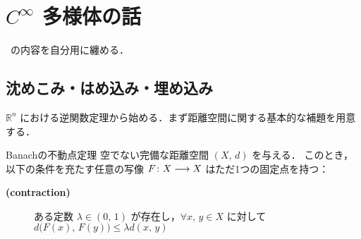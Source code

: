 \documentclass[TQFT_main]{subfiles}
\begin{document}
\chapter{$C^\infty$ 多様体の話}

~\cite[Chapter4, 5, 6]{Lee2012smooth}の内容を自分用に纏める．

\section{沈めこみ・はめ込み・埋め込み}

$\mathbb{R}^n$ における逆関数定理から始める．まず距離空間に関する基本的な補題を用意する．

\begin{mylem}[label=lem:contraction]{Banachの不動点定理}
    空でない完備な距離空間 $(X,\, d)$ を与える．
    このとき，以下の条件を充たす任意の写像 $F \colon X \longrightarrow X$ はただ1つの固定点を持つ：
    \begin{description}
        \item[\textbf{(contraction)}]  
        ある定数 $\lambda \in (0,\, 1)$ が存在し，$\forall x,\, y \in X$ に対して $d \bigl( F(x),\, F(y) \bigr) \le \lambda d(x,\, y)$
    \end{description}
\end{mylem}
\end{document}

